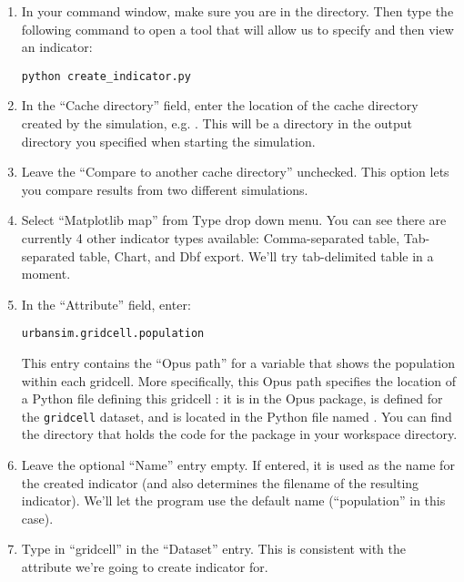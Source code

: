\documentclass{howto}
\begin{document}
\begin{enumerate}

\item In your command window, make sure you are in the
 directory.  Then type the following command to
open a tool that will allow us to specify and then view an
indicator:

\begin{verbatim}
python create_indicator.py
\end{verbatim}

\item In the ``Cache directory'' field, enter the location of the cache directory
created by the
simulation, e.g. .
This will be a directory in the output directory you specified when
starting the simulation.

\item Leave the ``Compare to another cache directory'' unchecked.  This option lets you 
compare results from two different simulations.

\item Select ``Matplotlib map'' from Type drop down menu. You can see there are currently 4 other
indicator types available: Comma-separated table, Tab-separated table, Chart, and Dbf export. We'll try 
tab-delimited table in a moment.

\item In the ``Attribute'' field, enter:

\begin{verbatim}
urbansim.gridcell.population
\end{verbatim}

This entry contains the ``Opus path'' for a variable that shows the
population within each gridcell.  More specifically, this Opus path specifies
the location of a Python file defining this gridcell : it is
in the  Opus package, is defined for the
\verb|gridcell| dataset, and is located in the Python file named
. You can find the directory that holds the code for
the  package in your workspace directory.

\item Leave the optional ``Name'' entry empty. If entered, it is used
as the
name for the created indicator (and also determines the filename of the
resulting indicator). We'll let the program use the default name
(``population'' in this case).

\item Type in ``gridcell'' in the ``Dataset'' entry.  This is consistent with the attribute 
we're going to create indicator for. 


\end{enumerate}
\end{document}
